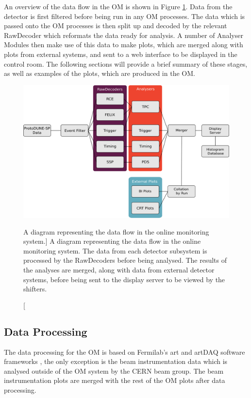 An overview of the data flow in the OM is shown in Figure \ref{fig:om_flow}. 
Data from the detector is first filtered before being run in any OM processes. 
The data which is passed onto the OM processes is then split up and decoded by 
the relevant RawDecoder which reformats the data ready for analysis. A number 
of Analyser Modules then make use of this data to make plots, which are merged 
along with plots from external systems, and sent to a web interface to be 
displayed in the control room. The following sections will provide a brief 
summary of these stages, as well as examples of the plots, which are produced in
the OM.

\begin{figure}

	\centering
	\includegraphics[width=\textwidth]{figures/om_flow.png}

	\caption
	[A diagram representing the data flow in the \protodune{} online monitoring system.]
	{A diagram representing the data flow in the \protodune{} online monitoring
	system. The data from each detector subsystem is processed by the RawDecoders
	before being analysed. The results of the analyses are merged, along with data
	from external detector systems, before being sent to the display server to be
	viewed by the shifters.}

	\label{fig:om_flow}

\end{figure}

\subsection{Data Processing}
The data processing for the OM is based on Fermilab's art and artDAQ software
frameworks \cite{Green:2012gv, 6495515}, the only exception is the beam 
instrumentation data which is analysed outside of the OM system by the CERN 
beam group. The beam instrumentation plots are merged with the rest of the OM 
plots after data processing.

